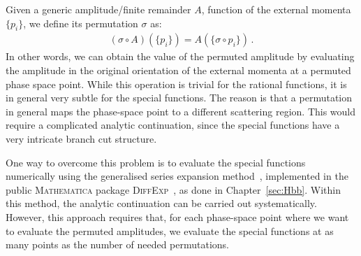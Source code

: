 \documentclass[main.tex]{subfiles}
\begin{document}
Given a generic amplitude/finite remainder $A$, function of the external momenta $\{p_i\}$, we define its permutation $\sigma$ as:
\begin{align}
\left(\sigma \circ A\right)\left(\{p_i\} \right) = A \left( \{ \sigma \circ p_i \}  \right) \,.
\end{align}
In other words, we can obtain the value of the permuted amplitude by evaluating the amplitude in the original orientation of the external momenta at a permuted phase space point. While this operation is trivial for the rational functions, it is in general very subtle for the special functions. The reason is that a permutation in general maps the phase-space point to a different scattering region. This would require a complicated analytic continuation, since the special functions have a very intricate branch cut structure.

One way to overcome this problem is to evaluate the special functions numerically using the generalised series expansion method~\cite{Moriello:2019yhu}, implemented in the public \textsc{Mathematica} package \textsc{DiffExp}~\cite{Hidding:2020ytt}, as done in Chapter~\ref{sec:Hbb}. 
Within this method, the analytic continuation can be carried out systematically. However, this approach requires that, for each phase-space point where we want to evaluate the permuted amplitudes, we evaluate the special functions at as many points as the number of needed permutations. 
\end{document}
